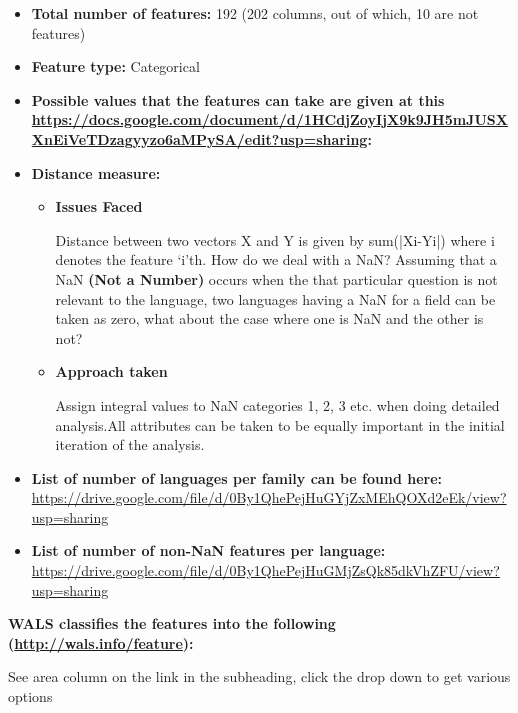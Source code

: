 \begin{itemize}
\item \textbf{Total number of features:} 192 (202 columns, out of which, 10 are not features)

 \item \textbf{Feature type:} Categorical

 \item \textbf{Possible values that the features can take are given at this \url{https://docs.google.com/document/d/1HCdjZoyIjX9k9JH5mJUSXXnEiVeTDzagyyzo6aMPySA/edit?usp=sharing}:}

 \item \textbf{Distance measure:}

\begin{itemize}
\item 
 \textbf{Issues Faced}

 Distance between two vectors X and Y is given by sum(|Xi-Yi|) where i denotes the feature ‘i’th. How do we deal with a NaN? Assuming that a NaN \textbf{(Not a Number)} occurs when the that particular question is not relevant to the language, two languages having a NaN for a field can be taken as zero, what about the case where one is NaN and the other is not?

\begin{figure}\end{figure}

 \item 
 \textbf{Approach taken}

 Assign integral values to NaN categories 1, 2, 3 etc. when doing detailed analysis.All attributes can be taken to be equally important in the initial iteration of the analysis.

\end{itemize}

\item \textbf{List of number of languages per family can be found here:} \url{https://drive.google.com/file/d/0By1QhePejHuGYjZxMEhQOXd2eEk/view?usp=sharing}

 \item \textbf{List of number of non-NaN features per language:} \url{https://drive.google.com/file/d/0By1QhePejHuGMjZsQk85dkVhZFU/view?usp=sharing}

\end{itemize}

\textbf{WALS classifies the features into the following (\url{http://wals.info/feature}):}

See area column on the link in the subheading, click the drop down to get various options

